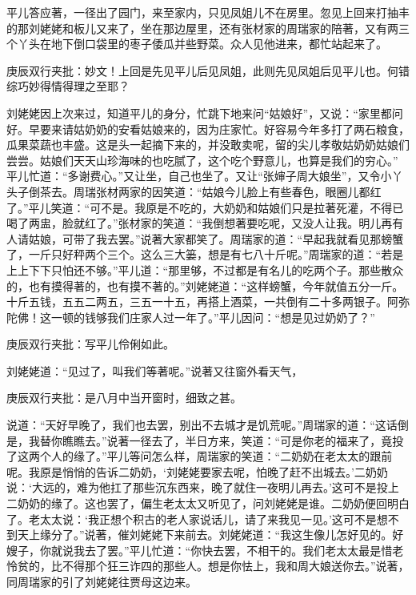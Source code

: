 \begin{parag}


    平儿答应著，一径出了园门，来至家内，只见凤姐儿不在房里。忽见上回来打抽丰的那刘姥姥和板儿又来了，坐在那边屋里，还有张材家的周瑞家的陪著，又有两三个丫头在地下倒口袋里的枣子倭瓜并些野菜。众人见他进来，都忙站起来了。\begin{note}庚辰双行夹批：妙文！上回是先见平儿后见凤姐，此则先见凤姐后见平儿也。何错综巧妙得情得理之至耶？\end{note}刘姥姥因上次来过，知道平儿的身分，忙跳下地来问“姑娘好”，又说：“家里都问好。早要来请姑奶奶的安看姑娘来的，因为庄家忙。好容易今年多打了两石粮食，瓜果菜蔬也丰盛。这是头一起摘下来的，并没敢卖呢，留的尖儿孝敬姑奶奶姑娘们尝尝。姑娘们天天山珍海味的也吃腻了，这个吃个野意儿，也算是我们的穷心。” 平儿忙道：“多谢费心。”又让坐，自己也坐了。又让“张婶子周大娘坐”，又令小丫头子倒茶去。周瑞张材两家的因笑道：“姑娘今儿脸上有些春色，眼圈儿都红了。”平儿笑道：“可不是。我原是不吃的，大奶奶和姑娘们只是拉著死灌，不得已喝了两盅，脸就红了。”张材家的笑道：“我倒想著要吃呢，又没人让我。明儿再有人请姑娘，可带了我去罢。”说著大家都笑了。周瑞家的道：“早起我就看见那螃蟹了，一斤只好秤两个三个。这么三大篓，想是有七八十斤呢。”周瑞家的道：“若是上上下下只怕还不够。”平儿道：“那里够，不过都是有名儿的吃两个子。那些散众的，也有摸得著的，也有摸不著的。”刘姥姥道：“这样螃蟹，今年就值五分一斤。十斤五钱，五五二两五，三五一十五，再搭上酒菜，一共倒有二十多两银子。阿弥陀佛！这一顿的钱够我们庄家人过一年了。”平儿因问：“想是见过奶奶了？”\begin{note}庚辰双行夹批：写平儿伶俐如此。\end{note}刘姥姥道：“见过了，叫我们等著呢。”说著又往窗外看天气，\begin{note}庚辰双行夹批：是八月中当开窗时，细致之甚。\end{note}说道：“天好早晚了，我们也去罢，别出不去城才是饥荒呢。”周瑞家的道：“这话倒是，我替你瞧瞧去。”说著一径去了，半日方来，笑道：“可是你老的福来了，竟投了这两个人的缘了。”平儿等问怎么样，周瑞家的笑道：“二奶奶在老太太的跟前呢。我原是悄悄的告诉二奶奶，‘刘姥姥要家去呢，怕晚了赶不出城去。’二奶奶说：‘大远的，难为他扛了那些沉东西来，晚了就住一夜明儿再去。’这可不是投上二奶奶的缘了。这也罢了，偏生老太太又听见了，问刘姥姥是谁。二奶奶便回明白了。老太太说：‘我正想个积古的老人家说话儿，请了来我见一见。’这可不是想不到天上缘分了。”说著，催刘姥姥下来前去。刘姥姥道：“我这生像儿怎好见的。好嫂子，你就说我去了罢。”平儿忙道：“你快去罢，不相干的。我们老太太最是惜老怜贫的，比不得那个狂三诈四的那些人。想是你怯上，我和周大娘送你去。”说著，同周瑞家的引了刘姥姥往贾母这边来。
\end{parag}


